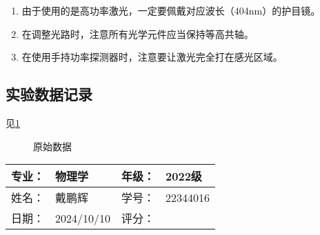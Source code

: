 \documentclass[dvipsnames, svgnames,a4paper,11pt]{article}
\begin{document}
		\begin{enumerate}
			\item 由于使用的是高功率激光，一定要佩戴对应波长（404nm）的护目镜。
			\item 在调整光路时，注意所有光学元件应当保持等高共轴。
			\item 在使用手持功率探测器时，注意要让激光完全打在感光区域。
				
		\end{enumerate}



\subsection{实验数据记录}

	见\cref{fig:data}

	\begin{figure}[htbp]
		\centering
		\quad
		\quad
		\newline
		\quad
		\caption{原始数据}
		\label{fig:data}
	\end{figure}
	






	

\clearpage
\begin{table}
	\renewcommand\arraystretch{1.7}
	\begin{tabularx}{\textwidth}{|X|X|X|X|}
	\hline
	专业：& 物理学 &年级：& 2022级\\
	\hline
	姓名： & 戴鹏辉 & 学号：& 22344016\\
	\hline
    日期：& 2024/10/10 & 评分： &\\
	\hline
	\end{tabularx}
\end{table}
\end{document}
